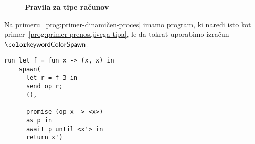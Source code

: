 \begin{figure}[h]
	\centering
	\small
	\textbf{Pravila za tipe računov}
	\begin{mathpar}
	\end{mathpar}
\end{figure}


Na primeru~\ref{prog:primer-dinamičen-proces} imamo program, ki naredi isto kot primer~\ref{prog:primer-prenosljivega-tipa}, le da tokrat uporabimo izračun $\tmkw{Spawn}$.

\begin{lstlisting}[caption={Primer uporabe dinamičnih procesov.},label={prog:primer-dinamičen-proces},float,floatplacement=h]
run let f = fun x -> (x, x) in
    spawn(
      let r = f 3 in
      send op r;
      (),
      
      promise (op x -> <x>)
      as p in
      await p until <x'> in
      return x')
\end{lstlisting}



